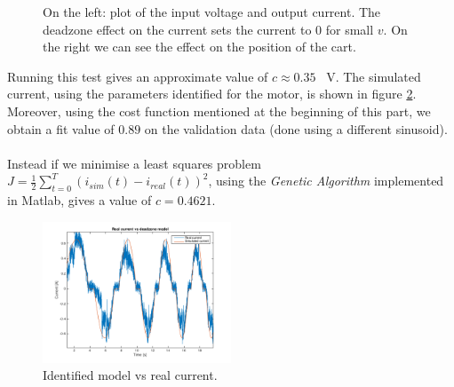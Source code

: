   \begin{figure}[!tbh]
  \centering
  \hfill
  \caption{On the left: plot of the input voltage and output current. The deadzone effect on the current sets the current to 0 for small $v$. On the right  we can see the effect on the position of the cart.}
    \label{fig:curposvolt}
\end{figure}
Running this test gives an approximate value of $c \approx 0.35$ \SI{}{\volt}. The simulated current, using the parameters identified for the motor, is shown in figure \ref{fig:deadzone_sim}. Moreover, using the cost function  mentioned at the beginning of this part, we obtain a fit value of $0.89$ on the validation data (done using a different sinusoid). \\ \\
Instead if we minimise a least squares problem $J = \frac{1}{2} \sum_{t=0}^T (i_{sim}(t) -i_{real}(t))^2$, using the \emph{Genetic Algorithm} implemented in Matlab, gives a value of $c =0.4621$.
  \begin{figure}[!h]
  \centering
  \includegraphics[width=0.5\textwidth]{img/deadzone3.png}
  \caption{Identified model vs real current.}
    \label{fig:deadzone_sim}
\end{figure}
